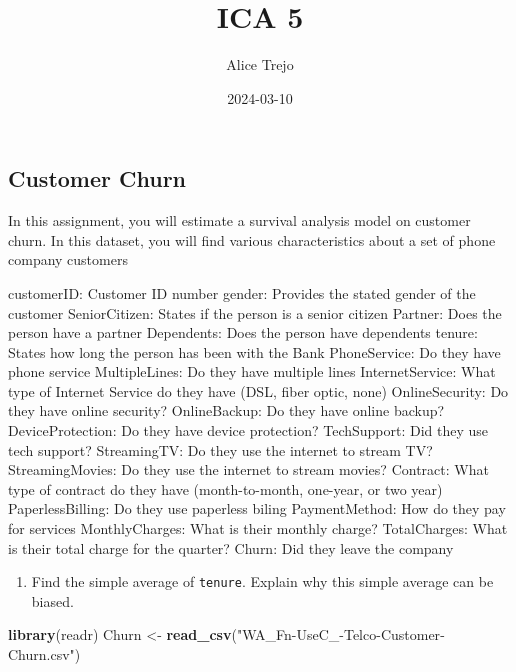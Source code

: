 \documentclass[
]{article}
\title{ICA 5}
\author{Alice Trejo}
\date{2024-03-10}
\newenvironment{Shaded}{\begin{snugshade}}{\end{snugshade}}
\newcommand{\FunctionTok}[1]{\textcolor[rgb]{0.13,0.29,0.53}{\textbf{#1}}}
\newcommand{\NormalTok}[1]{#1}
\newcommand{\OtherTok}[1]{\textcolor[rgb]{0.56,0.35,0.01}{#1}}
\newcommand{\StringTok}[1]{\textcolor[rgb]{0.31,0.60,0.02}{#1}}
\providecommand{\tightlist}{%
  \setlength{\itemsep}{0pt}\setlength{\parskip}{0pt}}
\begin{document}
\maketitle

\hypertarget{customer-churn}{%
\subsection{Customer Churn}\label{customer-churn}}

In this assignment, you will estimate a survival analysis model on
customer churn. In this dataset, you will find various characteristics
about a set of phone company customers

customerID: Customer ID number gender: Provides the stated gender of the
customer SeniorCitizen: States if the person is a senior citizen
Partner: Does the person have a partner Dependents: Does the person have
dependents tenure: States how long the person has been with the Bank
PhoneService: Do they have phone service MultipleLines: Do they have
multiple lines InternetService: What type of Internet Service do they
have (DSL, fiber optic, none) OnlineSecurity: Do they have online
security? OnlineBackup: Do they have online backup? DeviceProtection: Do
they have device protection? TechSupport: Did they use tech support?
StreamingTV: Do they use the internet to stream TV? StreamingMovies: Do
they use the internet to stream movies? Contract: What type of contract
do they have (month-to-month, one-year, or two year) PaperlessBilling:
Do they use paperless biling PaymentMethod: How do they pay for services
MonthlyCharges: What is their monthly charge? TotalCharges: What is
their total charge for the quarter? Churn: Did they leave the company

\begin{enumerate}
\def\labelenumi{\arabic{enumi})}
\tightlist
\item
  Find the simple average of \texttt{tenure}. Explain why this simple
  average can be biased.
\end{enumerate}

\begin{Shaded}
\begin{Highlighting}[]
\FunctionTok{library}\NormalTok{(readr)}
\NormalTok{Churn }\OtherTok{\textless{}{-}} \FunctionTok{read\_csv}\NormalTok{(}\StringTok{"WA\_Fn{-}UseC\_{-}Telco{-}Customer{-}Churn.csv"}\NormalTok{)}
\end{Highlighting}
\end{Shaded}
\end{document}
